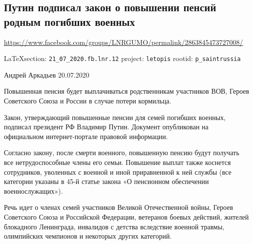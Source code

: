  
 
\subsection{Путин подписал закон о повышении пенсий родным погибших военных}
\url{https://www.facebook.com/groups/LNRGUMO/permalink/2863845473727008/}
  
\vspace{0.5cm}
{\small\LaTeX section: \verb|21_07_2020.fb.lnr.12| project: \verb|letopis| rootid: \verb|p_saintrussia|}
\vspace{0.5cm}

Андрей Аркадьев
20.07.2020

Повышенная пенсия будет выплачиваться родственникам участников ВОВ, Героев
Советского Союза и России в случае потери кормильца.

Закон, утверждающий повышенные пенсии для семей погибших военных, подписал
президент РФ Владимир Путин. Документ опубликован на официальном
интернет-портале правовой информации.

Согласно закону, после смерти военного, повышенную пенсию будут получать все
нетрудоспособные члены его семьи.  Повышение выплат также коснется сотрудников,
уволенных с военной и иной приравненной к ней службы (все категории указаны в
45-й статье закона «О пенсионном обеспечении военнослужащих»).

Речь идет о членах семей участников Великой Отечественной войны, Героев
Советского Союза и Российской Федерации, ветеранов боевых действий, жителей
блокадного Ленинграда, инвалидов с детства вследствие военной травмы,
олимпийских чемпионов и некоторых других категорий.
  
